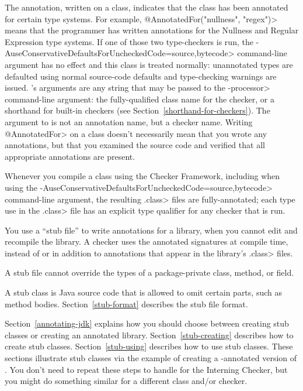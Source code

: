 The  annotation, written on a
class, indicates that the class has been annotated for certain type
systems.  For example, \<@AnnotatedFor(\ttlcb"nullness", "regex"\ttrcb)> means that
the programmer has written annotations for the Nullness and Regular
Expression type systems.  If one of those two type-checkers is run,
the \<-AuseConservativeDefaultsForUncheckedCode=source,bytecode> command-line argument
has no effect and this class is treated normally:
unannotated types are defaulted using normal source-code
defaults and type-checking warnings are issued.
's arguments are any string that
may be passed to the \<-processor> command-line argument:  the
fully-qualified class name for the checker, or a shorthand for built-in
checkers (see Section~\ref{shorthand-for-checkers}).
The argument to  is not an
annotation name, but a checker name.
Writing \<@AnnotatedFor> on a class doesn't necessarily mean that you wrote
any annotations, but that you examined the source code and verified
that all appropriate annotations are present.

\begin{sloppypar}
Whenever you compile a class using the Checker Framework, including when
using the \<-AuseConservativeDefaultsForUncheckedCode=source,bytecode> command-line
argument, the resulting \<.class> files are fully-annotated; each type use
in the \<.class> file has an explicit type qualifier for any checker that
is run.
\end{sloppypar}



You use a ``stub file'' to write annotations
for a library, when you cannot edit and recompile the library.  A
checker uses the annotated signatures at compile time, instead of or in
addition to annotations that appear in the library's \<.class> files.

A stub file cannot override the types of a package-private class, method, or field.

A stub class is Java source code that is allowed to omit certain parts,
such as method bodies.  Section~\ref{stub-format} describes
the stub file format.

Section~\ref{annotating-jdk} explains how you should choose between
creating stub classes or creating an annotated library.
Section~\ref{stub-creating} describes how to create stub classes.
Section~\ref{stub-using} describes how to use stub classes.
These sections illustrate stub classes via the example of creating a -annotated
version of .  You don't need to repeat these steps
to handle  for the Interning Checker,
but you might do something similar for a different class and/or checker.

